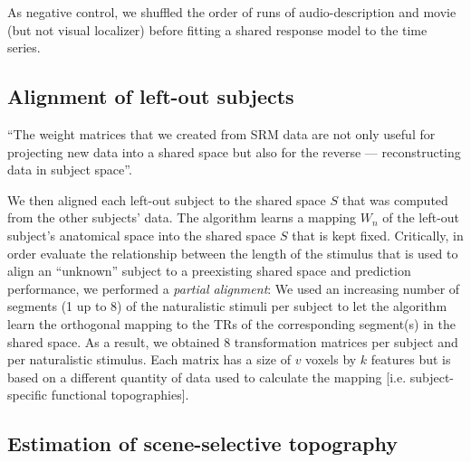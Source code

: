 As negative control, we shuffled the order of runs of audio-description and
movie (but not visual localizer) before fitting a shared response model to the
time series.


\subsection{Alignment of left-out subjects}


%
%

``The weight matrices that we created from SRM data are not only useful for
projecting new data into a shared space but also for the reverse —
reconstructing data in subject space''.

%
We then aligned each left-out subject to the shared space $S$ that was computed
from the other subjects' data.
%
The algorithm learns a mapping $W_{n}$ of the left-out subject's anatomical
space into the shared space $S$ that is kept fixed.
%
Critically, in order evaluate the relationship between the length of the
stimulus that is used to align an ``unknown'' subject to a preexisting shared
space and prediction performance, we performed a \textit{partial alignment}:
%
We used an increasing number of segments (1 up to 8) of the naturalistic stimuli
per subject to let the algorithm learn the orthogonal mapping to the TRs of the
corresponding segment(s) in the shared space.
%
As a result, we obtained 8 transformation matrices per subject and per
naturalistic stimulus.
%
Each matrix has a size of $v$ voxels by $k$ features but is based on a different
quantity of data used to calculate the mapping [i.e. subject-specific functional
topographies].


\subsection{Estimation of scene-selective topography}



